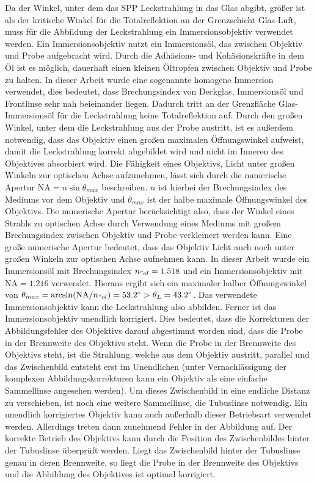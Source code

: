 \documentclass[titlepage]{article}
\begin{document}
	Da der Winkel, unter dem das SPP Leckstrahlung in das Glas abgibt, größer ist als der kritische Winkel für die Totalreflektion an der Grenzschicht Glas-Luft, muss für die Abbildung der Leckstrahlung ein Immersionsobjektiv verwendet werden. Ein Immersionsobjektiv nutzt ein Immersionsöl, das zwischen Objektiv und Probe aufgebracht wird. Durch die Adhäsions- und Kohäsionskräfte in dem Öl ist es möglich, dauerhaft einen kleinen Öltropfen zwischen Objektiv und Probe zu halten. In dieser Arbeit  wurde eine sogenannte homogene Immersion verwendet, dies bedeutet, dass Brechungsindex von Deckglas, Immersionsöl und Frontlinse sehr nah beieinander liegen. Dadurch tritt an der Grenzfläche Glas-Immersionsöl für die Leckstrahlung keine Totalreflektion auf. Durch den großen Winkel, unter dem die Leckstrahlung aus der Probe austritt, ist es außerdem notwendig, dass das Objektiv einen großen maximalen Öffnungswinkel aufweist, damit die Leckstrahlung korrekt abgebildet wird und nicht im Inneren des Objektives absorbiert wird. Die Fähigkeit eines Objektivs, Licht unter großen Winkeln zur optischen Achse aufzunehmen, lässt sich durch die numerische Apertur $\mathrm{NA} = n\sin\theta_{max}$ beschreiben. $n$ ist hierbei der Brechungsindex des Mediums vor dem Objektiv und $\theta_{max}$ ist der halbe maximale Öffnungswinkel des Objektivs. Die numerische Apertur berücksichtigt also, dass der Winkel eines Strahls zu optischen Achse durch Verwendung eines Mediums mit großem Brechungsindex zwischen Objektiv und Probe verkleinert werden kann. Eine große numerische Apertur bedeutet, dass das Objektiv Licht auch noch unter großen Winkeln zur optischen Achse aufnehmen kann. In dieser Arbeit wurde ein Immersionsöl mit Brechungsindex $n_{"ol} = 1.518$ und ein Immersionsobjektiv mit $\mathrm{NA} = 1.216$ verwendet. Hieraus ergibt sich ein maximaler halber Öffnungswinkel von $\theta_{max} = \arcsin(\mathrm{NA} / n_{"ol}) = 53.2^\circ > \theta_L = 43.2^\circ$. Das verwendete Immersionsobjektiv kann die Leckstrahlung also abbilden. Ferner ist das Immersionsobjektiv unendlich korrigiert. Dies bedeutet, dass die Korrekturen der Abbildungsfehler des Objektivs darauf abgestimmt worden sind, dass die Probe in der Brennweite des Objektivs steht. Wenn die Probe in der Brennweite des Objektivs steht, ist die Strahlung, welche aus dem Objektiv austritt, parallel und das Zwischenbild entsteht erst im Unendlichen (unter Vernachlässigung der komplexen Abbildungskorrekturen kann ein Objektiv als eine einfache Sammellinse angesehen werden). Um dieses Zwischenbild in eine endliche Distanz zu verschieben, ist noch eine weitere Sammellinse, die Tubuslinse notwendig. Ein unendlich korrigiertes Objektiv kann auch außerhalb dieser Betriebsart verwendet werden. Allerdings treten dann zunehmend Fehler in der Abbildung auf. Der korrekte Betrieb des Objektivs kann durch die Position des Zwischenbildes hinter der Tubuslinse überprüft werden. Liegt das Zwischenbild hinter der Tubuslinse genau in deren Brennweite, so liegt die Probe in der Brennweite des Objektivs und die Abbildung des Objektives ist optimal korrigiert.\cite{Kuhl.2018}
\end{document}
